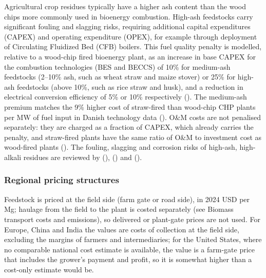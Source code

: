 \documentclass[
  letterpaper,
]{article}
\begin{document}
Agricultural crop residues typically have a higher ash content than the
wood chips more commonly used in bioenergy combustion. High-ash
feedstocks carry significant fouling and slagging risks, requiring
additional capital expenditures (CAPEX) and operating expenditure
(OPEX), for example through deployment of Circulating Fluidized Bed
(CFB) boilers. This fuel quality penalty is modelled, relative to a
wood-chip fired bioenergy plant, as an increase in base CAPEX for the
combustion technologies (BES and BECCS) of 10\% for medium-ash
feedstocks (2--10\% ash, such as wheat straw and maize stover) or 25\%
for high-ash feedstocks (above 10\%, such as rice straw and husk), and a
reduction in electrical conversion efficiency of 5\% or 10\%
respectively (). The medium-ash premium
matches the 9\% higher cost of straw-fired than wood-chip CHP plants per
MW of fuel input in Danish technology data
(). O\&M costs are not penalised
separately: they are charged as a fraction of CAPEX, which already
carries the penalty, and straw-fired plants have the same ratio of O\&M
to investment cost as wood-fired plants
(). The fouling, slagging and corrosion
risks of high-ash, high-alkali residues are reviewed by
(),
() and
().

\subsubsection{Regional pricing
structures}\label{regional-pricing-structures}

Feedstock is priced at the field side (farm gate or road side), in 2024
USD per Mg; haulage from the field to the plant is costed separately
(see Biomass transport costs and emissions), so delivered or plant-gate
prices are not used. For Europe, China and India the values are costs of
collection at the field side, excluding the margins of farmers and
intermediaries; for the United States, where no comparable national cost
estimate is available, the value is a farm-gate price that includes the
grower's payment and profit, so it is somewhat higher than a cost-only
estimate would be.
\end{document}
